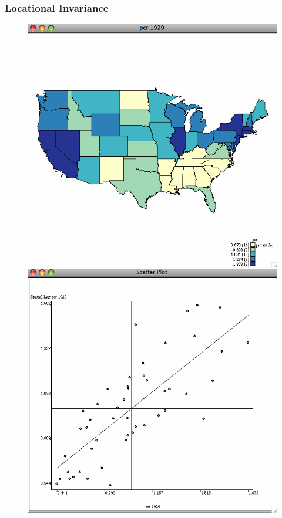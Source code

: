 \documentclass[nototal]{beamer}
\begin{document}
\begin{frame}
	\frametitle{Locational Invariance}
 \begin{figure}[ht]
  \begin{minipage}[b]{0.4\linewidth}
  \centering
  \includegraphics[scale=0.20]{income29.png}
  \end{minipage}
  \begin{minipage}[b]{0.4\linewidth}
  \centering
  \includegraphics[scale=0.20]{moran29.png}

\end{minipage}
\end{figure}
\end{frame}
\end{document}
